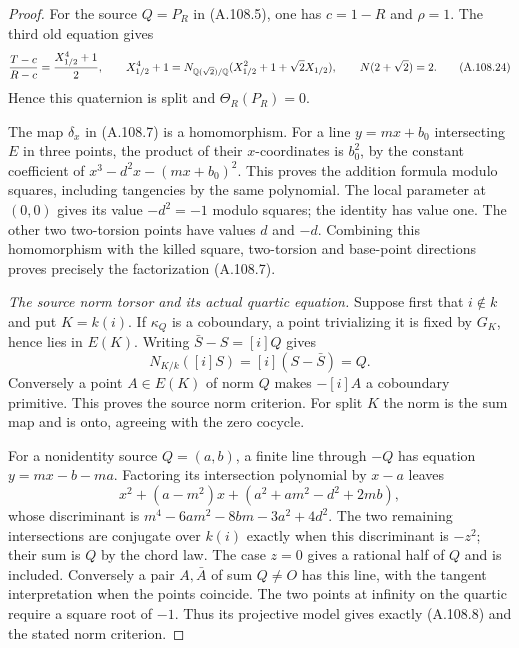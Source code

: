 \begin{proof}
For the source $Q=P_R$ in (A.108.5), one has
$c=1-R$ and $\rho=1$.
The third old equation gives
\[
 \frac{T-c}{R-c}=\frac{X_{1/2}^4+1}{2},\qquad
 X_{1/2}^4+1=
 N_{\mathbb Q(\sqrt2)/\mathbb Q}
        (X_{1/2}^2+1+\sqrt2X_{1/2}),\qquad
                  N(2+\sqrt2)=2.
\tag{A.108.24}
\]
Hence this quaternion is split and
$\Theta_R(P_R)=0$.

The map $\delta_x$ in (A.108.7) is a homomorphism.
For a line $y=mx+b_0$ intersecting $E$ in three
points, the product of their $x$-coordinates is
$b_0^2$, by the constant coefficient of
$x^3-d^2x-(mx+b_0)^2$.
This proves the addition formula modulo squares,
including tangencies by the same polynomial.
The local parameter at $(0,0)$ gives its value
$-d^2=-1$ modulo squares; the identity has value one.
The other two two-torsion points have values
$d$ and $-d$.
Combining this homomorphism with the killed
square, two-torsion and base-point directions
proves precisely the factorization (A.108.7).

\emph{The source norm torsor and its actual quartic equation.}
Suppose first that $i\notin k$ and put $K=k(i)$.
If $\kappa_Q$ is a coboundary, a point trivializing
it is fixed by $G_K$, hence lies in $E(K)$.
Writing $\bar S-S=[i]Q$ gives
\[
          N_{K/k}([i]S)=[i](S-\bar S)=Q.
\tag{A.108.25}
\]
Conversely a point $A\in E(K)$ of norm $Q$
makes $-[i]A$ a coboundary primitive.
This proves the source norm criterion.
For split $K$ the norm is the sum map and is
onto, agreeing with the zero cocycle.

For a nonidentity source $Q=(a,b)$, a finite
line through $-Q$ has equation
$y=mx-b-ma$.
Factoring its intersection polynomial by $x-a$
leaves
\[
 x^2+(a-m^2)x+(a^2+am^2-d^2+2mb),
\tag{A.108.26}
\]
whose discriminant is
$m^4-6am^2-8bm-3a^2+4d^2$.
The two remaining intersections are conjugate
over $k(i)$ exactly when this discriminant is
$-z^2$; their sum is $Q$ by the chord law.
The case $z=0$ gives a rational half of $Q$ and
is included.
Conversely a pair $A,\bar A$ of sum $Q\ne O$
has this line, with the tangent interpretation
when the points coincide.
The two points at infinity on the quartic
require a square root of $-1$.
Thus its projective model gives exactly
(A.108.8) and the stated norm criterion.
\end{proof}

